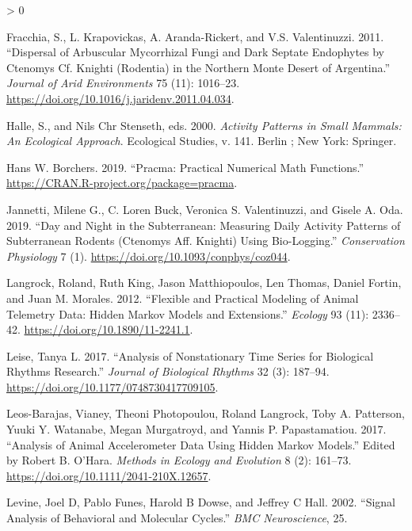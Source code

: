 \documentclass[english,msc,numbers,hidelinks]{coppe}
\newlength{\cslhangindent}
\newenvironment{CSLReferences}[2] %
 {%
  \setlength{\parindent}{0pt}
  \ifodd #1 \everypar{\setlength{\hangindent}{\cslhangindent}}\ignorespaces\fi
  \ifnum #2 > 0
  \setlength{\parskip}{#2\baselineskip}
  \fi
 }%
 {}
\begin{document}
\begin{CSLReferences}{1}{0}
  \leavevmode\hypertarget{ref-fracchia2011}{}%
  Fracchia, S., L. Krapovickas, A. Aranda-Rickert, and V.S. Valentinuzzi. 2011. {``Dispersal of Arbuscular Mycorrhizal Fungi and Dark Septate Endophytes by Ctenomys Cf. Knighti (Rodentia) in the Northern Monte Desert of Argentina.''} \emph{Journal of Arid Environments} 75 (11): 1016--23. \url{https://doi.org/10.1016/j.jaridenv.2011.04.034}.

  \leavevmode\hypertarget{ref-activity2000}{}%
  Halle, S., and Nils Chr Stenseth, eds. 2000. \emph{Activity Patterns in Small Mammals: An Ecological Approach}. Ecological Studies, v. 141. Berlin ; New York: Springer.

  \leavevmode\hypertarget{ref-hansw.borchers2019}{}%
  Hans W. Borchers. 2019. {``Pracma: Practical Numerical Math Functions.''} \url{https://CRAN.R-project.org/package=pracma}.

  \leavevmode\hypertarget{ref-jannetti2019}{}%
  Jannetti, Milene G., C. Loren Buck, Veronica S. Valentinuzzi, and Gisele A. Oda. 2019. {``Day and Night in the Subterranean: Measuring Daily Activity Patterns of Subterranean Rodents (Ctenomys Aff. Knighti) Using Bio-Logging.''} \emph{Conservation Physiology} 7 (1). \url{https://doi.org/10.1093/conphys/coz044}.

  \leavevmode\hypertarget{ref-langrock2012}{}%
  Langrock, Roland, Ruth King, Jason Matthiopoulos, Len Thomas, Daniel Fortin, and Juan M. Morales. 2012. {``Flexible and Practical Modeling of Animal Telemetry Data: Hidden Markov Models and Extensions.''} \emph{Ecology} 93 (11): 2336--42. \url{https://doi.org/10.1890/11-2241.1}.

  \leavevmode\hypertarget{ref-leise2017}{}%
  Leise, Tanya L. 2017. {``Analysis of Nonstationary Time Series for Biological Rhythms Research.''} \emph{Journal of Biological Rhythms} 32 (3): 187--94. \url{https://doi.org/10.1177/0748730417709105}.

  \leavevmode\hypertarget{ref-leosbarajas2017}{}%
  Leos-Barajas, Vianey, Theoni Photopoulou, Roland Langrock, Toby A. Patterson, Yuuki Y. Watanabe, Megan Murgatroyd, and Yannis P. Papastamatiou. 2017. {``Analysis of Animal Accelerometer Data Using Hidden Markov Models.''} Edited by Robert B. O'Hara. \emph{Methods in Ecology and Evolution} 8 (2): 161--73. \url{https://doi.org/10.1111/2041-210X.12657}.

  \leavevmode\hypertarget{ref-levine2002}{}%
  Levine, Joel D, Pablo Funes, Harold B Dowse, and Jeffrey C Hall. 2002. {``Signal Analysis of Behavioral and Molecular Cycles.''} \emph{BMC Neuroscience}, 25.


\end{CSLReferences}
\end{document}
